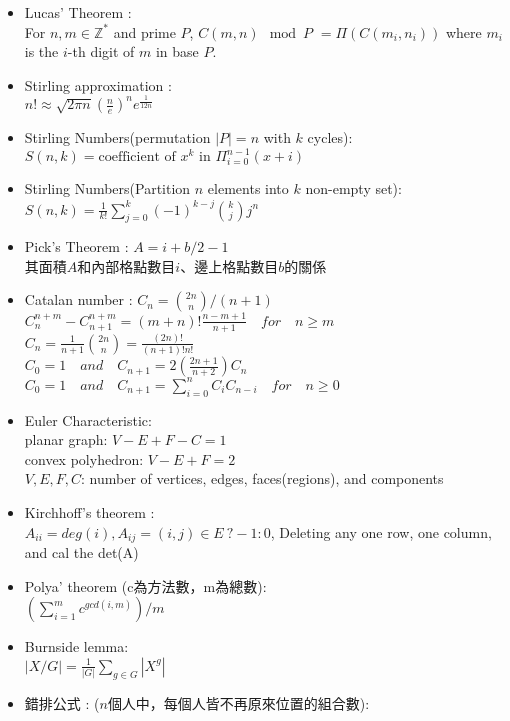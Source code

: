 \begin{itemize}
\item Lucas’ Theorem :\\
  For $n, m \in \mathbb{Z}^{*}$ and prime $P$,
  $C(m,n) \mod P$
	$= \Pi ( C(m_i,n_i) )$
  where $m_i$ is the $i$-th digit of $m$ in base $P$.
\item Stirling approximation : \\
  $n!\approx\sqrt{ 2 \pi n}(\frac{n}{e})^{n}e^\frac{1}{12n}$
\item Stirling Numbers(permutation $|P|=n$ with $k$ cycles): \\
  $S(n,k) = \text{coefficient of }x^k \text{ in } \Pi_{i=0}^{n-1} (x+i)$
\item Stirling Numbers(Partition $n$ elements into $k$ non-empty set): \\
  $S(n,k) = \frac{1}{k!} \sum\limits_{j=0}^k (-1)^{k-j} {k \choose j} j^n$
\item Pick’s Theorem : $A = i + b/2 - 1$\\
  其面積$A$和內部格點數目$i$、邊上格點數目$b$的關係
\item Catalan number : $C_n = {2n \choose n}/(n+1)$\\
  $C^{n+m}_{n}-C^{n+m}_{n+1} = (m+n)! \frac{n-m+1}{n+1}\quad for \quad  n \ge m$\\
  $C_n = \frac{1}{n+1}{2n \choose n} = \frac{(2n)!}{(n+1)!n!}$\\
  $C_0 = 1 \quad  and \quad C_{n+1}= 2(\frac{2n+1}{n+2})C_n$\\
  $C_0 = 1 \quad  and \quad C_{n+1} = \sum_{i=0}^{n} C_iC_{n-i} \quad for \quad  n \ge 0$
\item Euler Characteristic: \\
  planar graph: $V-E+F-C=1$ \\
  convex polyhedron: $V-E+F=2$ \\
  $V,E,F,C$: number of vertices, edges, faces(regions), and components
\item Kirchhoff's theorem : \\
  $A_{ii} = deg(i), A_{ij} = (i,j) \in E\ ? -1 : 0$,
  Deleting any one row, one column, and cal the det(A)
\item Polya' theorem (c為方法數，m為總數): \\
  $(\sum_{i=1}^{m}{c^{gcd(i,m)}})/m$
\item Burnside lemma: \\
  $|X/G| = \frac{1}{|G|}\sum\limits_{g\in G} |X^g|$
\item 錯排公式 :  ($n$個人中，每個人皆不再原來位置的組合數): \\

\end{itemize}
